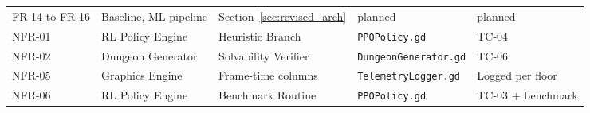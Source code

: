 \begin{table}[!htbp]
\begin{tabular}{p{}p{}p{}p{}p{}}
FR-14 to FR-16 & Baseline, ML pipeline & Section~\ref{sec:revised_arch} & planned & planned \\
NFR-01 & RL Policy Engine & Heuristic Branch & \texttt{PPOPolicy.gd} & TC-04 \\
NFR-02 & Dungeon Generator & Solvability Verifier & \texttt{DungeonGenerator.gd} & TC-06 \\
NFR-05 & Graphics Engine & Frame-time columns & \texttt{TelemetryLogger.gd} & Logged per floor \\
NFR-06 & RL Policy Engine & Benchmark Routine & \texttt{PPOPolicy.gd} & TC-03 + benchmark \\
\bottomrule
\end{tabular}
\end{table}
